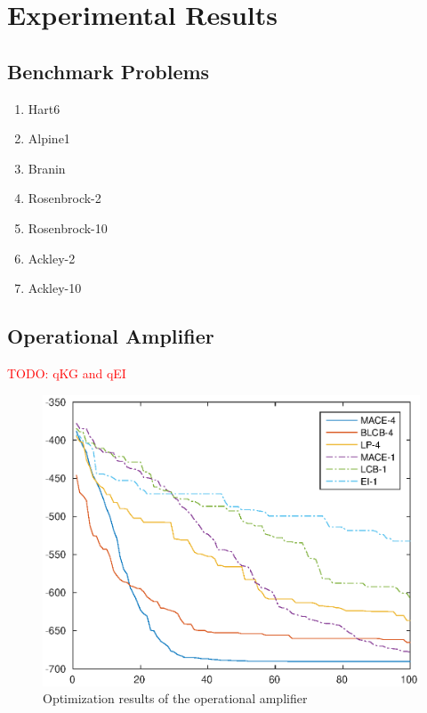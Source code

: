 \section{Experimental Results}

\subsection{Benchmark Problems}

\begin{enumerate}
        \item Hart6
        \item Alpine1
        \item Branin
        \item Rosenbrock-2
        \item Rosenbrock-10
        \item Ackley-2
        \item Ackley-10
\end{enumerate}

\subsection{Operational Amplifier}

\textcolor{red}{TODO: qKG and qEI}

\begin{figure}[]
\vskip 0.2in
\begin{center}
\centerline{\includegraphics[width=\columnwidth]{./img/mean_DAC2014.eps}}
\caption{Optimization results of the operational amplifier}
\label{resDAC2014}
\end{center}
\vskip -0.2in
\end{figure}
